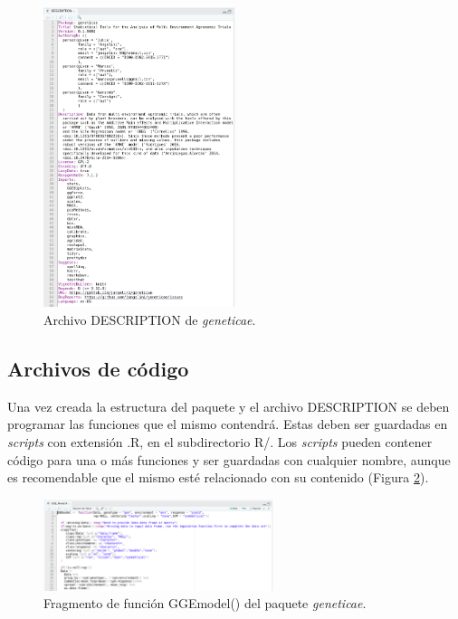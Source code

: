 \begin{figure}[h]
	\begin{center}
		\includegraphics[width=0.50\textwidth]{./Graficos/DESCRIPTION.png}	
	\end{center}
	\caption{Archivo DESCRIPTION de \emph{geneticae}.}
	\label{fig:fig33}
\end{figure}


\subsection{Archivos de código}

Una vez creada la estructura del paquete y el archivo DESCRIPTION se deben programar las funciones que el mismo contendrá. Estas deben ser guardadas en \emph{scripts} con extensión .R, en el subdirectorio R/. Los \emph{scripts} pueden contener código para una o más funciones y ser guardadas con cualquier nombre, aunque es recomendable que el mismo esté relacionado con su contenido  (Figura \ref{fig:fig34}).

\begin{figure}[h]
	\begin{center}
		\includegraphics[width=0.60\textwidth]{./Graficos/GGEMODELFUNCTION.png}	
	\end{center}
	\caption{Fragmento de función \textcolor{fandango}{GGEmodel()} del paquete \emph{geneticae}.}
	\label{fig:fig34}
\end{figure}


